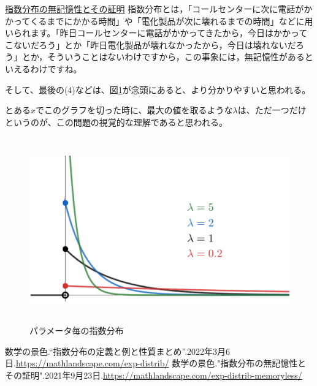 \documentclass[a4paper, 10pt, dvipdfmx]{jlreq}
\begin{document}
\begin{itembox}[l]{\href{https://mathlandscape.com/exp-distrib-memoryless/}{指数分布の無記憶性とその証明}}
    指数分布とは，「コールセンターに次に電話がかかってくるまでにかかる時間」や「電化製品が次に壊れるまでの時間」などに用いられます。「昨日コールセンターに電話がかかってきたから，今日はかかってこないだろう」とか「昨日電化製品が壊れなかったから，今日は壊れないだろう」とか，そういうことはないわけですから，この事象には，無記憶性があるといえるわけですね。
\end{itembox}

そして、最後の(4)などは、図\ref{img:param}が念頭にあると、より分かりやすいと思われる。

とある$x$でこのグラフを切った時に、最大の値を取るような$\lambda$は、ただ一つだけというのが、この問題の視覚的な理解であると思われる。

\newpage

\begin{figure}[htbp]
    \begin{center}
        \includegraphics[height=80mm]{exp-distrib-many-1024x583.png}
        \caption{パラメータ毎の指数分布 \cite{site:1}}
        \label{img:param}
    \end{center}
\end{figure}


\begin{thebibliography}{9}
    数学の景色.“指数分布の定義と例と性質まとめ”.2022年3月6日.\url{https://mathlandscape.com/exp-distrib/}
    数学の景色."指数分布の無記憶性とその証明".2021年9月23日.\url{https://mathlandscape.com/exp-distrib-memoryless/}
\end{thebibliography}
\end{document}
